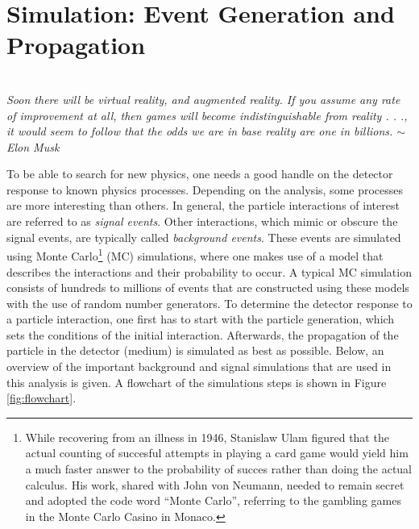 \chapter{Simulation: Event Generation and Propagation}
\label{ch:simulation}
\begin{flushright}
\textit{\\Soon there will be virtual reality, and augmented reality. If you assume any rate of improvement at all, then games will become indistinguishable from reality . . ., it would seem to follow that the odds we are in base reality are one in billions. $\sim$ Elon Musk\\}
\end{flushright}
To be able to search for new physics, one needs a good handle on the detector response to known physics processes. Depending on the analysis, some processes are more interesting than others. In general, the particle interactions of interest are referred to as \textit{signal events}. Other interactions, which mimic or obscure the signal events, are typically called \textit{background events}. These events are simulated using Monte Carlo\footnote{While recovering from an illness in 1946, Stanislaw Ulam figured that the actual counting of succesful attempts in playing a card game would yield him a much faster answer to the probability of succes rather than doing the actual calculus. His work, shared with John von Neumann, needed to remain secret and adopted the code word ``Monte Carlo'', referring to the gambling games in the Monte Carlo Casino in Monaco.} (MC) simulations, where one makes use of a model that describes the interactions and their probability to occur. A typical MC simulation consists of hundreds to millions of events that are constructed using these models with the use of random number generators. To determine the detector response to a particle interaction, one first has to start with the particle generation, which sets the conditions of the initial interaction. Afterwards, the propagation of the particle in the detector (medium) is simulated as best as possible. Below, an overview of the important background and signal simulations that are used in this analysis is given. A flowchart of the simulations steps is shown in Figure \ref{fig:flowchart}.

